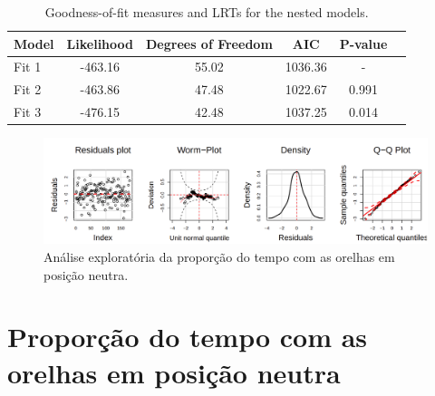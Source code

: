 \documentclass[
  ignorenonframetext,
  serif,
  professionalfont,
  usenames,
  dvipsnames,
  aspectratio = 169]{beamer}
\begin{document}
\begin{frame}{}
\protect\hypertarget{section-1}{}
\begin{table}[h]
    \centering
    \caption{Goodness-of-fit measures and LRTs for the nested  models.}
    \begin{tabular}{lccccc}
        \hline
        {\color[HTML]{000000} Model} & {\color[HTML]{000000} Likelihood} & {\color[HTML]{000000} Degrees of Freedom} & {\color[HTML]{000000} AIC}     & {\color[HTML]{000000} P-value}         \\ \hline
        {\color[HTML]{000000} Fit 1} & {\color[HTML]{000000} -463.16}    & {\color[HTML]{000000} 55.02}              & {\color[HTML]{000000} 1036.36} & {\color[HTML]{000000} -}               \\
        {\color[HTML]{000000} Fit 2} & {\color[HTML]{000000} -463.86}    & {\color[HTML]{000000} 47.48}              & {\color[HTML]{000000} 1022.67} & {\color[HTML]{000000} 0.991}            \\
        {\color[HTML]{000000} Fit 3} & {\color[HTML]{000000} -476.15}    & {\color[HTML]{000000} 42.48}              & {\color[HTML]{000000} 1037.25} & {\color[HTML]{000000} 0.014} \\ \hline
    \end{tabular}
    \label{tab:tab2}
\end{table}
\end{frame}

\begin{frame}{}
\protect\hypertarget{section-2}{}
\begin{figure}

{\centering \includegraphics[width=0.95\linewidth]{./img/mzanbi} 

}

\caption{Análise exploratória da proporção do tempo com as orelhas em posição neutra.}\label{fig:unnamed-chunk-11}
\end{figure}
\end{frame}

\hypertarget{proporuxe7uxe3o-do-tempo-com-as-orelhas-em-posiuxe7uxe3o-neutra}{%
\section{Proporção do tempo com as orelhas em posição
neutra}\label{proporuxe7uxe3o-do-tempo-com-as-orelhas-em-posiuxe7uxe3o-neutra}}
\end{document}
